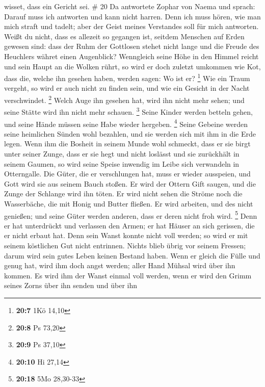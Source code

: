 wisset, dass ein Gericht sei. \# 20  Da antwortete Zophar
von Naema und sprach:  Darauf muss ich antworten und kann
nicht harren.  Denn ich muss hören, wie man mich straft
und tadelt; aber der Geist meines Verstandes soll für mich antworten.
 Weißt du nicht, dass es allezeit so gegangen ist, seitdem
Menschen auf Erden gewesen sind:  dass der Ruhm der
Gottlosen stehet nicht lange und die Freude des Heuchlers währet einen
Augenblick?  Wenngleich seine Höhe in den Himmel reicht
und sein Haupt an die Wolken rührt,  so wird er doch
zuletzt umkommen wie Kot, dass die, welche ihn gesehen haben, werden
sagen: Wo ist er? \footnote{\textbf{20:7} 1Kö 14,10}  Wie
ein Traum vergeht, so wird er auch nicht zu finden sein, und wie ein
Gesicht in der Nacht verschwindet. \footnote{\textbf{20:8} Ps 73,20}
 Welch Auge ihn gesehen hat, wird ihn nicht mehr sehen;
und seine Stätte wird ihn nicht mehr schauen. \footnote{\textbf{20:9} Ps
  37,10}  Seine Kinder werden betteln gehen, und seine
Hände müssen seine Habe wieder hergeben. \footnote{\textbf{20:10} Hi
  27,14}  Seine Gebeine werden seine heimlichen Sünden
wohl bezahlen, und sie werden sich mit ihm in die Erde legen.
 Wenn ihm die Bosheit in seinem Munde wohl schmeckt, dass
er sie birgt unter seiner Zunge,  dass er sie hegt und
nicht loslässt und sie zurückhält in seinem Gaumen,  so
wird seine Speise inwendig im Leibe sich verwandeln in Otterngalle.
 Die Güter, die er verschlungen hat, muss er wieder
ausspeien, und Gott wird sie aus seinem Bauch stoßen.  Er
wird der Ottern Gift saugen, und die Zunge der Schlange wird ihn töten.
 Er wird nicht sehen die Ströme noch die Wasserbäche, die
mit Honig und Butter fließen.  Er wird arbeiten, und des
nicht genießen; und seine Güter werden anderen, dass er deren nicht froh
wird. \footnote{\textbf{20:18} 5Mo 28,30-33}  Denn er hat
unterdrückt und verlassen den Armen; er hat Häuser an sich gerissen, die
er nicht erbaut hat.  Denn sein Wanst konnte nicht voll
werden; so wird er mit seinem köstlichen Gut nicht entrinnen.
 Nichts blieb übrig vor seinem Fressen; darum wird sein
gutes Leben keinen Bestand haben.  Wenn er gleich die
Fülle und genug hat, wird ihm doch angst werden; aller Hand Mühsal wird
über ihn kommen.  Es wird ihm der Wanst einmal voll
werden, wenn er wird den Grimm seines Zorns über ihn senden und über ihn
